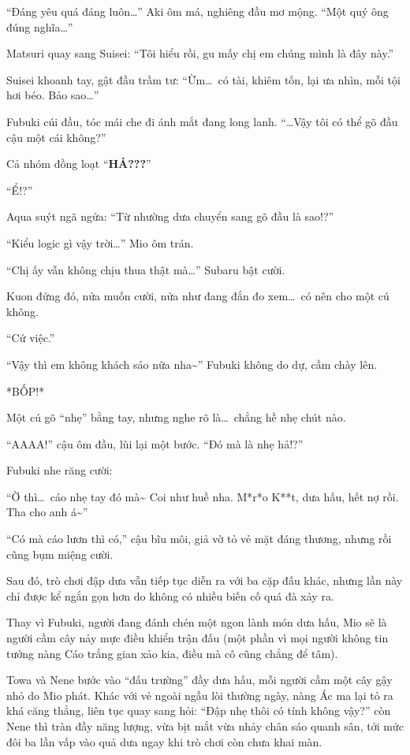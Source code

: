 \documentclass[../main.tex]{subfiles}
\begin{document}
``Đáng yêu quá đáng luôn\dots'' Aki ôm má, nghiêng đầu mơ mộng. ``Một quý ông đúng nghĩa\dots''

Matsuri quay sang Suisei: ``Tôi hiểu rồi, gu mấy chị em chúng mình là đây này.''

Suisei khoanh tay, gật đầu trầm tư: ``Ừm\dots\ có tài, khiêm tốn, lại ưa nhìn, mỗi tội hơi béo. Bảo sao\dots''

Fubuki cúi đầu, tóc mái che đi ánh mắt đang long lanh. ``\dots Vậy tôi có thể gõ đầu cậu một cái không?''

Cả nhóm đồng loạt ``\textbf{HẢ???}''

``Ể!?''

Aqua suýt ngã ngửa: ``Từ nhường dưa chuyển sang gõ đầu là sao!?''

``Kiểu logic gì vậy trời\dots'' Mio ôm trán.

``Chị ấy vẫn không chịu thua thật mà\dots'' Subaru bật cười.

Kuon đứng đó, nửa muốn cười, nửa như đang đắn đo xem\dots\ có nên cho một cú không.

``Cứ việc.''

``Vậy thì em không khách sáo nữa nha\~{}'' Fubuki không do dự, cầm chày lên.

*BỐP!*

Một cú gõ ``nhẹ'' bằng tay, nhưng nghe rõ là\dots\ chẳng hề nhẹ chút nào.

``AAAA!'' cậu ôm đầu, lùi lại một bước.
``Đó mà là nhẹ hả!?''

Fubuki nhe răng cười:

``Ờ thì\dots\ cáo nhẹ tay đó mà\~{} Coi như huề nha. M*r*o K**t, dưa hấu, hết nợ rồi. Tha cho anh á\~{}''

``Có mà cáo lươn thì có,'' cậu bĩu môi, giả vờ tỏ vẻ mặt đáng thương, nhưng rồi cũng bụm miệng cười.

Sau đó, trò chơi đập dưa vẫn tiếp tục diễn ra với ba cặp đấu khác, nhưng lần này chỉ được kể ngắn gọn hơn do không có nhiều biến cố quá đà xảy ra.

\ct

Thay vì Fubuki, người đang đánh chén một ngon lành món dưa hấu, Mio sẽ là người cầm cây nảy mực điều khiển trận đấu (một phần vì mọi người không tin tưởng nàng Cáo trắng gian xảo kia, điều mà cô cũng chẳng để tâm).

Towa và Nene bước vào ``đấu trường'' đầy dưa hấu, mỗi người cầm một cây gậy nhỏ do Mio phát. Khác với vẻ ngoài ngầu lòi thường ngày, nàng Ác ma lại tỏ ra khá căng thẳng, liên tục quay sang hỏi: ``Đập nhẹ thôi có tính không vậy?'' còn Nene thì tràn đầy năng lượng, vừa bịt mắt vừa nhảy chân sáo quanh sân, tới mức đôi ba lần vấp vào quả dưa ngay khi trò chơi còn chưa khai màn.
\end{document}
